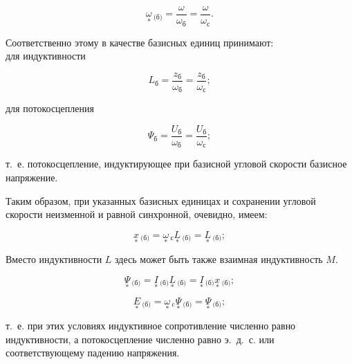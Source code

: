 \begin{equation} %
	\label{eq:2-14 omega_baz_otn}
	\underset{*}{\omega}\!\,_{\text{(б)}} = \frac{\omega}{\omega_{\text{б}}} = \frac{\omega}{\omega_{\text{с}}}.
\end{equation}

Соответственно этому в качестве базисных единиц принимают:\\
для индуктивности

\begin{equation*}
	L_{\text{б}} = \frac{z_{\text{б}}}{\omega_{\text{б}}} = \frac{z_{\text{б}}}{\omega_{\text{с}}};
\end{equation*}

для потокосцепления

\begin{equation*}
	\Psi_{\text{б}} = \frac{U_{\text{б}}}{\omega_{\text{б}}} = \frac{U_{\text{б}}}{\omega_{\text{с}}};
\end{equation*}

т.~е. потокосцепление, индуктирующее при базисной угловой скорости базисное напряжение.

Таким образом, при указанных базисных единицах и сохранении угловой скорости неизменной и равной синхронной, очевидно, имеем:

\begin{equation} %
	\label{eq:2-15 x_baz_otn_from_L}
	\underset{*}{x}\!\,_{\text{(б)}} = \underset{*}{\omega}\!\,_{\text{с}}\underset{*}{L}\!\,_{\text{(б)}} = \underset{*}{L}\!\,_{\text{(б)}};
\end{equation}

Вместо индуктивности $ L $ здесь может быть также взаимная индуктивность $ M $. %

\begin{equation} %
	\label{eq:2-16 Psi_baz_otn_from_I_and_L}
	\underset{*}{\Psi}\!\,_{\text{(б)}} = \underset{*}{I}\!\,_{\text{(б)}}\underset{*}{L}\!\,_{\text{(б)}} = \underset{*}{I}\!\,_{\text{(б)}}\underset{*}{x}\!\,_{\text{(б)}};
\end{equation}

\begin{equation} %
	\label{eq:2-17 E_baz_otn_from_omega_and_Psi}
	\underset{*}{E}\!\,_{\text{(б)}} = \underset{*}{\omega}\!\,_{\text{c}}\underset{*}{\Psi}\!\,_{\text{(б)}} = \underset{*}{\Psi}\!\,_{\text{(б)}};
\end{equation}

т.~е. при этих условиях индуктивное сопротивление численно равно индуктивности, а потокосцепление численно равно э.~д.~с. или соответствующему падению напряжения.

